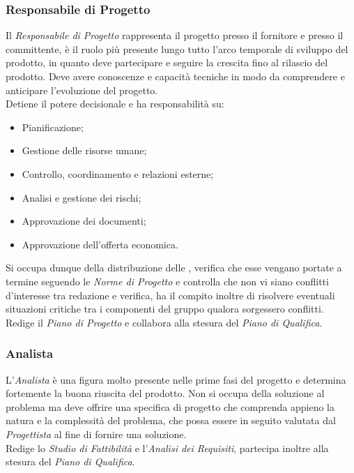 \documentclass{scalatekids-article}
\begin{document}
\subsubsection{Responsabile di Progetto}
Il \textit{Responsabile di Progetto} rappresenta il progetto presso il fornitore
e presso il committente, è il ruolo più presente lungo tutto l'arco temporale di
sviluppo del prodotto, in quanto deve partecipare e seguire la
crescita fino al rilascio del prodotto. Deve avere conoscenze e capacità
tecniche in modo da comprendere e anticipare l'evoluzione del progetto.\\
Detiene il potere decisionale e ha responsabilità su:
\begin{itemize}
\item Pianificazione;
\item Gestione delle risorse umane;
\item Controllo, coordinamento e relazioni esterne;
\item Analisi e gestione dei rischi;
\item Approvazione dei documenti;
\item Approvazione dell'offerta economica.
\end{itemize}
Si occupa dunque della distribuzione delle , verifica che esse vengano
portate a termine seguendo le \textit{Norme di Progetto} e controlla che non vi
siano conflitti d'interesse tra redazione e verifica, ha il compito inoltre di
risolvere eventuali situazioni critiche tra i componenti del gruppo qualora
sorgessero conflitti.\\ Redige il \textit{Piano di Progetto} e collabora alla
stesura del \textit{Piano di Qualifica}.
\subsubsection{Analista}
L'\textit{Analista} è una figura molto presente nelle prime fasi del progetto e
determina fortemente la buona riuscita del prodotto. Non si occupa della
soluzione al problema ma deve offrire una specifica di progetto che comprenda
appieno la natura e la complessità del problema, che possa essere in seguito
valutata dal \textit{Progettista} al fine di fornire una soluzione.\\ Redige lo
\textit{Studio di Fattibilità} e l'\textit{Analisi dei Requisiti}, partecipa
inoltre alla stesura del \textit{Piano di Qualifica}.
\end{document}
